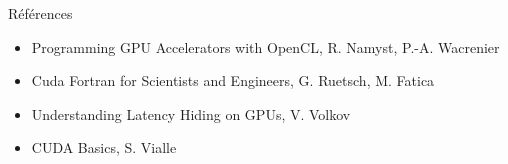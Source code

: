 \documentclass[11pt,mathserif]{beamer}
\begin{document}
\begin{frame}{Références}
\begin{itemize}[<+->]
  \item Programming GPU Accelerators with OpenCL, R. Namyst, P.-A. Wacrenier \href{https://raymond-namyst.emi.u-bordeaux.fr/ens/pap/PAP-GPU.pdf}{}
  \item Cuda Fortran for Scientists and Engineers, G. Ruetsch, M. Fatica
  \item Understanding Latency Hiding on GPUs, V. Volkov
  \item CUDA Basics, S. Vialle \href{http://www.metz.supelec.fr/metz/personnel/vialle/course/PPS-5A-GPGPU/notes-de-cours-specifiques/PPS-GPU-02-CUDA-Basics-2spp.pdf}{}
\end{itemize}
\end{frame}
\end{document}
